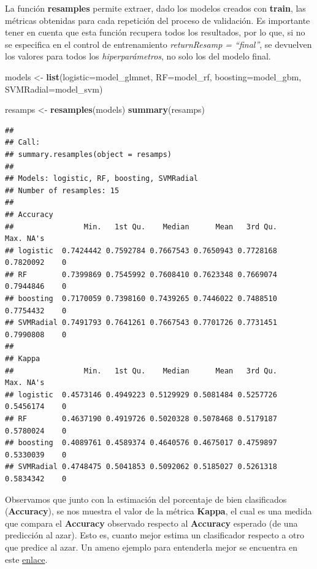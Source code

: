 \documentclass[]{article}
\newenvironment{Shaded}{\begin{snugshade}}{\end{snugshade}}
\newcommand{\DataTypeTok}[1]{\textcolor[rgb]{0.13,0.29,0.53}{#1}}
\newcommand{\KeywordTok}[1]{\textcolor[rgb]{0.13,0.29,0.53}{\textbf{#1}}}
\newcommand{\NormalTok}[1]{#1}
\newcommand{\StringTok}[1]{\textcolor[rgb]{0.31,0.60,0.02}{#1}}
\begin{document}
La función \textbf{resamples} permite extraer, dado los modelos creados
con \textbf{train}, las métricas obtenidas para cada repetición del
proceso de validación. Es importante tener en cuenta que esta función
recupera todos los resultados, por lo que, si no se especifica en el
control de entrenamiento \emph{returnResamp = ``final''}, se devuelven
los valores para todos los \emph{hiperparámetros}, no solo los del
modelo final.

\begin{Shaded}
\begin{Highlighting}[]
\NormalTok{models <-}\StringTok{ }\KeywordTok{list}\NormalTok{(}\DataTypeTok{logistic=}\NormalTok{model_glmnet,}
               \DataTypeTok{RF=}\NormalTok{model_rf, }
               \DataTypeTok{boosting=}\NormalTok{model_gbm, }
               \DataTypeTok{SVMRadial=}\NormalTok{model_svm)}

\NormalTok{resamps <-}\StringTok{ }\KeywordTok{resamples}\NormalTok{(models)}
\KeywordTok{summary}\NormalTok{(resamps)}
\end{Highlighting}
\end{Shaded}

\begin{verbatim}
## 
## Call:
## summary.resamples(object = resamps)
## 
## Models: logistic, RF, boosting, SVMRadial 
## Number of resamples: 15 
## 
## Accuracy 
##                Min.   1st Qu.    Median      Mean   3rd Qu.      Max. NA's
## logistic  0.7424442 0.7592784 0.7667543 0.7650943 0.7728168 0.7820092    0
## RF        0.7399869 0.7545992 0.7608410 0.7623348 0.7669074 0.7944846    0
## boosting  0.7170059 0.7398160 0.7439265 0.7446022 0.7488510 0.7754432    0
## SVMRadial 0.7491793 0.7641261 0.7667543 0.7701726 0.7731451 0.7990808    0
## 
## Kappa 
##                Min.   1st Qu.    Median      Mean   3rd Qu.      Max. NA's
## logistic  0.4573146 0.4949223 0.5129929 0.5081484 0.5257726 0.5456174    0
## RF        0.4637190 0.4919726 0.5020328 0.5078468 0.5179187 0.5780024    0
## boosting  0.4089761 0.4589374 0.4640576 0.4675017 0.4759897 0.5330039    0
## SVMRadial 0.4748475 0.5041853 0.5092062 0.5185027 0.5261318 0.5834342    0
\end{verbatim}

Observamos que junto con la estimación del porcentaje de bien
clasificados (\textbf{Accuracy}), se nos muestra el valor de la métrica
\textbf{Kappa}, el cual es una medida que compara el \textbf{Accuracy}
observado respecto al \textbf{Accuracy} esperado (de una predicción al
azar). Esto es, cuanto mejor estima un clasificador respecto a otro que
predice al azar. Un ameno ejemplo para entenderla mejor se encuentra en
este
\href{https://stats.stackexchange.com/questions/82162/cohens-kappa-in-plain-english}{enlace}.
\end{document}
